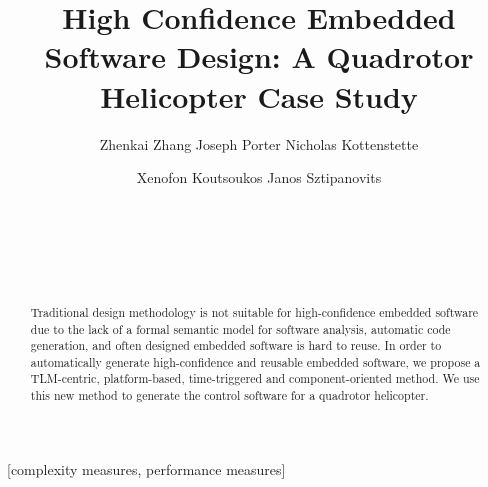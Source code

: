 \documentclass{acm_proc_article-sp}
\begin{document}
\title{High Confidence Embedded Software Design: A Quadrotor Helicopter Case Study}

\author{
\alignauthor Zhenkai Zhang
\alignauthor Joseph Porter
\alignauthor Nicholas Kottenstette
\and  %
\alignauthor Xenofon Koutsoukos
\alignauthor Janos Sztipanovits
\and
{}\\
\\
\\
\\
}


\maketitle
\begin{abstract}
Traditional design methodology is not suitable for high-confidence embedded software due to the lack of a formal semantic model for software analysis, automatic code generation, and often designed embedded software is hard to reuse. In order to automatically generate high-confidence and reusable embedded software, we propose a TLM-centric, platform-based, time-triggered and component-oriented method. We use this new method to generate the control software for a quadrotor helicopter.
\end{abstract}

[complexity measures, performance measures]


\end{document}
